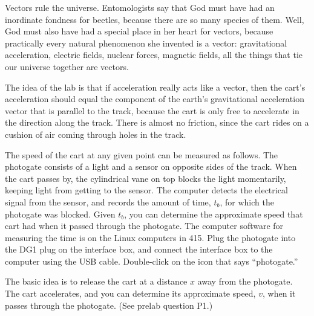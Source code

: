 \label{lab:acceltwod}

\apparatus
{}


\introduction

Vectors rule the universe.  Entomologists say that God must
have had an inordinate fondness for beetles, because there
are so many species of them.  Well, God must also have had a
special place in her heart for vectors, because practically
every natural phenomenon she invented is a vector:
gravitational acceleration, electric fields, nuclear forces,
magnetic fields, all the things that tie our universe
together are vectors.


\setup

The idea of the lab is that if acceleration really acts like
a vector, then the cart's acceleration should equal the
component of the earth's gravitational acceleration vector
that is parallel to the track, because the cart is only free
to accelerate in the direction along the track.  There is
almost no friction, since the cart rides on a cushion of air
coming through holes in the track.

The speed of the cart at any given point can be measured as
follows.  The photogate consists of a light and a sensor on
opposite sides of the track.  When the cart passes by, the
cylindrical vane on top blocks the light momentarily, keeping
light from getting to the sensor.  The computer detects the
electrical signal from the sensor, and records the amount of
time, $t_b$, for which the photogate was blocked.  Given
$t_b$, you can determine the approximate speed that cart had
when it passed through the photogate.  The computer software
for measuring the time is on the Linux computers in 415.
Plug the photogate into the DG1 plug
on the interface box, and connect the interface box to the computer
using the USB cable.
Double-click on the icon that says ``photogate.''


\observations

The basic idea is to release the cart at a distance $x$ away
from the photogate.  The cart accelerates, and you can
determine its approximate speed, $v$, when it passes through
the photogate.  (See prelab question P1.)


